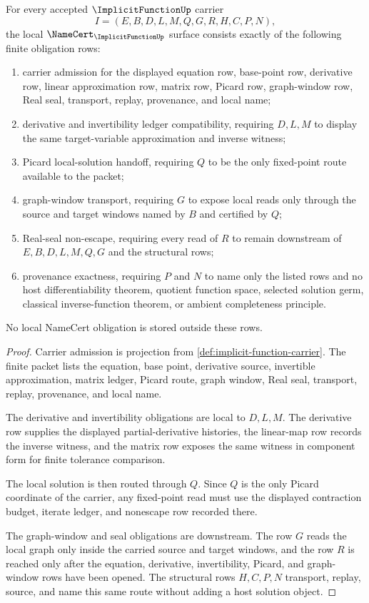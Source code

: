 \begin{theorem}\label{thm:implicit-function-namecert-obligations}
For every accepted $\ImplicitFunctionUp$ carrier
$$
I=(E,B,D,L,M,Q,G,R,H,C,P,N),
$$
the local $\NameCert_{\ImplicitFunctionUp}$ surface consists exactly of the following finite obligation rows:
\begin{enumerate}
\item carrier admission for the displayed equation row, base-point row, derivative row, linear approximation row, matrix row, Picard row, graph-window row, Real seal, transport, replay, provenance, and local name;
\item derivative and invertibility ledger compatibility, requiring $D,L,M$ to display the same target-variable approximation and inverse witness;
\item Picard local-solution handoff, requiring $Q$ to be the only fixed-point route available to the packet;
\item graph-window transport, requiring $G$ to expose local reads only through the source and target windows named by $B$ and certified by $Q$;
\item Real-seal non-escape, requiring every read of $R$ to remain downstream of $E,B,D,L,M,Q,G$ and the structural rows;
\item provenance exactness, requiring $P$ and $N$ to name only the listed rows and no host differentiability theorem, quotient function space, selected solution germ, classical inverse-function theorem, or ambient completeness principle.
\end{enumerate}
No local NameCert obligation is stored outside these rows.
\end{theorem}
\begin{proof}
Carrier admission is projection from \autoref{def:implicit-function-carrier}. The finite packet lists the equation, base point, derivative source, invertible approximation, matrix ledger, Picard route, graph window, Real seal, transport, replay, provenance, and local name.

The derivative and invertibility obligations are local to $D,L,M$. The derivative row supplies the displayed partial-derivative histories, the linear-map row records the inverse witness, and the matrix row exposes the same witness in component form for finite tolerance comparison.

The local solution is then routed through $Q$. Since $Q$ is the only Picard coordinate of the carrier, any fixed-point read must use the displayed contraction budget, iterate ledger, and nonescape row recorded there.

The graph-window and seal obligations are downstream. The row $G$ reads the local graph only inside the carried source and target windows, and the row $R$ is reached only after the equation, derivative, invertibility, Picard, and graph-window rows have been opened. The structural rows $H,C,P,N$ transport, replay, source, and name this same route without adding a host solution object.
\end{proof}

